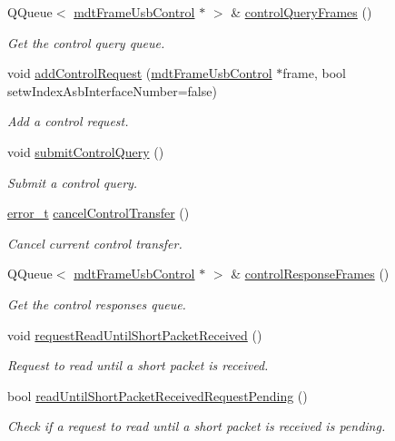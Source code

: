 \begin{DoxyCompactItemize}
QQueue$<$ \hyperlink{classmdt_frame_usb_control}{mdtFrameUsbControl} $\ast$ $>$ \& \hyperlink{classmdt_usb_port_afbb20c403e7a5885d5e4221bab9f304e}{controlQueryFrames} ()
\begin{DoxyCompactList}\small\item\em Get the control query queue. \end{DoxyCompactList}\item 
void \hyperlink{classmdt_usb_port_a4fbcd0fcc179335c55c6d7ccc40a7c31}{addControlRequest} (\hyperlink{classmdt_frame_usb_control}{mdtFrameUsbControl} $\ast$frame, bool setwIndexAsbInterfaceNumber=false)
\begin{DoxyCompactList}\small\item\em Add a control request. \end{DoxyCompactList}\item 
void \hyperlink{classmdt_usb_port_a274b6fd10bd84027bb66773ed805de2a}{submitControlQuery} ()
\begin{DoxyCompactList}\small\item\em Submit a control query. \end{DoxyCompactList}\item 
\hyperlink{classmdt_abstract_port_ad4121bb930c95887e77f8bafa065a85e}{error\_\-t} \hyperlink{classmdt_usb_port_a6566e654df8a1c3503941702593db3c5}{cancelControlTransfer} ()
\begin{DoxyCompactList}\small\item\em Cancel current control transfer. \end{DoxyCompactList}\item 
QQueue$<$ \hyperlink{classmdt_frame_usb_control}{mdtFrameUsbControl} $\ast$ $>$ \& \hyperlink{classmdt_usb_port_a304825c7d9173a3dcb5e26a412f1038b}{controlResponseFrames} ()
\begin{DoxyCompactList}\small\item\em Get the control responses queue. \end{DoxyCompactList}\item 
void \hyperlink{classmdt_usb_port_a719fc7b43461a3e2d9a4926d3e3961c2}{requestReadUntilShortPacketReceived} ()
\begin{DoxyCompactList}\small\item\em Request to read until a short packet is received. \end{DoxyCompactList}\item 
bool \hyperlink{classmdt_usb_port_a3c0685d67fe608abe24c140c2858779c}{readUntilShortPacketReceivedRequestPending} ()
\begin{DoxyCompactList}\small\item\em Check if a request to read until a short packet is received is pending. \end{DoxyCompactList}\item 

\end{DoxyCompactItemize}
